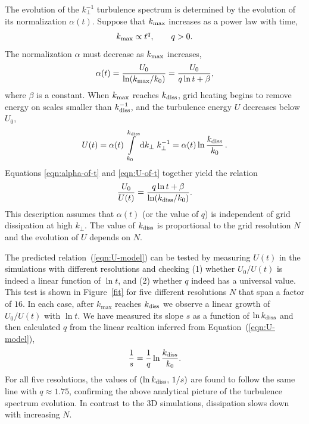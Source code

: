 The evolution of the $k_\perp^{-1}$ turbulence spectrum is determined by the evolution of its normalization $\alpha(t)$.
Suppose that $k_{\rm max}$ increases as a power law with time, 
%
\begin{equation}
  k_{\rm max} \propto t^q, \qquad q>0.
\end{equation}
%
The normalization $\alpha$ must decrease as $k_{\rm max}$ increases,
%
\begin{equation}\label{eqn:alpha-of-t}
	\alpha(t) = \frac{U_0}{\ln(k_{\rm max}/k_0)} = \frac{U_0}{q\ln t+\beta},
\end{equation}
%
where $\beta$ is a constant. When $k_{\rm max}$ reaches $k_{\rm diss}$, grid heating begins to remove energy on scales smaller than $k_{\rm diss}^{-1}$, and the turbulence energy $U$ decreases below $U_0$,
%
\begin{equation}\label{eqn:U-of-t}
	U(t) = \alpha(t) \int\limits_{k_{0}} ^{k_{\rm diss}} \mathrm{d} k_{\perp}\; k_\perp^{-1} = \alpha(t) \ln \frac{k_{\rm diss}}{k_0}\, .
\end{equation} 
%
Equations \ref{eqn:alpha-of-t} and \ref{eqn:U-of-t} together yield the relation
\begin{equation}\label{eqn:U-model}
	\frac{U_0}{U(t)} = \frac{q\ln t + \beta}{\ln(k_{\rm diss} / k_0)}.
\end{equation}
%
This description assumes that $\alpha(t)$ (or the value of $q$) is independent of grid dissipation at high $k_\perp$. The value of $k_{\rm diss}$ is proportional to the grid resolution $N$ and the evolution of $U$ depends on $N$.

The predicted relation~(\ref{eqn:U-model}) can be tested by measuring $U(t)$ in the simulations with different resolutions and checking (1) whether $U_0/U(t)$ is indeed a linear function of $\ln t$, and (2) whether $q$ indeed has a universal value. This test is shown in Figure~\ref{fit} for five different resolutions $N$ that span a factor of $16$. In each case, after $k_{\max}$ reaches $k_{\rm diss}$ we observe a linear growth of $U_0/U(t)$ with $\ln t$. We have measured its slope $s$ as a function of $\ln k_{\rm diss}$ and then calculated $q$ from the linear realtion inferred from Equation~(\ref{eqn:U-model}),
%
\begin{equation}
   \frac{1}{s}=\frac{1}{q}\ln\frac{k_{\rm diss}}{k_0}.
\end{equation}
%
For all five resolutions, the values of $(\ln k_{\rm diss},\,1/s)$ are found to follow the same line with $q\approx 1.75$, confirming the above analytical picture of the turbulence spectrum evolution. In contrast to the 3D simulations, dissipation slows down with increasing $N$.

